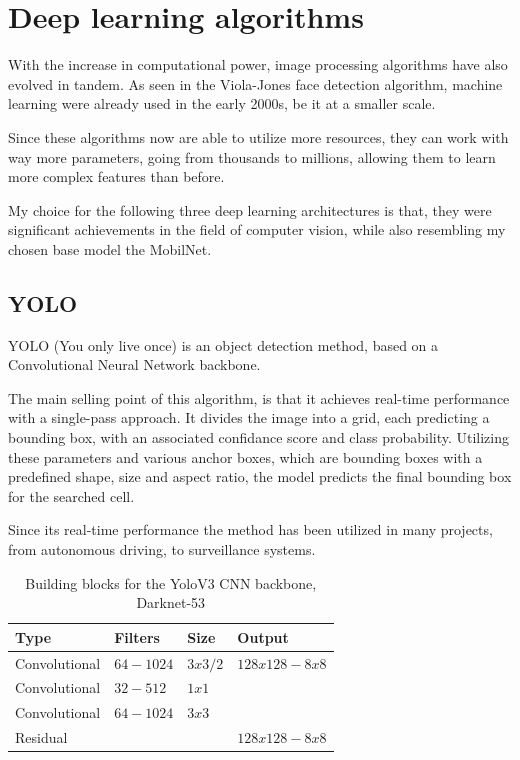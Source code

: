 \section{Deep learning algorithms}
\label{sec:ch2sec2}
\par With the increase in computational power, image processing algorithms have also evolved in tandem. As seen in the Viola-Jones face detection algorithm, machine learning were already used in the early 2000s, be it at a smaller scale.
\par Since these algorithms now are able to utilize more resources, they can work with way more parameters, going from thousands to millions, allowing them to learn more complex features than before.
\par My choice for the following three deep learning architectures is that, they were significant achievements in the field of computer vision, while also resembling my chosen base model the MobilNet.

\subsection{YOLO}
\label{subsec:ch2sec2subsec1}
\par YOLO (You only live once) is an object detection method, based on a Convolutional Neural Network backbone.
\par The main selling point of this algorithm, is that it achieves real-time performance with a single-pass approach. It divides the image into a grid, each predicting a bounding box, with an associated confidance score and class probability. Utilizing these parameters and various anchor boxes, which are bounding boxes with a predefined shape, size and aspect ratio, the model predicts the final bounding box for the searched cell. \cite{redmon2018yolov3}
\par Since its real-time performance the method has been utilized in many projects, from autonomous driving, to surveillance systems.

\begin{table}[htbp]
\begin{center}
\begin{tabular}
{|p{90pt}|p{90pt}|p{90pt}|p{90pt}|}
\hline
 Type  &  Filters & Size & Output\\
\hline 
\hline Convolutional & $64-1024$ & $3x3/2$ & $128x128-8x8$ \\
\hline Convolutional & $32-512$ & $1x1$ & $ $ \\
\hline Convolutional & $64-1024$ & $3x3$ & $ $ \\
\hline Residual & $ $ & $ $ & $128x128-8x8$ \\
\hline
\end{tabular}
\end{center}
\caption{Building blocks for the YoloV3 CNN backbone, Darknet-53 \cite{redmon2018yolov3}}
\label{YoloTable}
\end{table}

